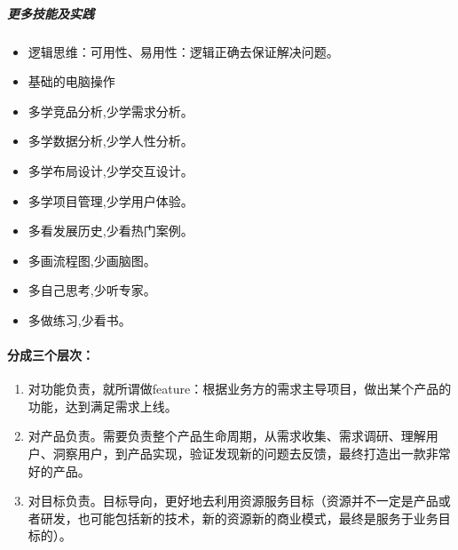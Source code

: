 \documentclass[letterpaper,11pt,english]{sphinxmanual}
\begin{document}
\subparagraph{更多技能及实践}
\label{\detokenize{chapter_introduction/PM:id50}}\begin{itemize}
\item {} 
逻辑思维：可用性、易用性：逻辑正确去保证解决问题。

\item {} 
基础的电脑操作

\item {} 
多学竞品分析,少学需求分析。

\item {} 
多学数据分析,少学人性分析。

\item {} 
多学布局设计,少学交互设计。

\item {} 
多学项目管理,少学用户体验。

\item {} 
多看发展历史,少看热门案例。

\item {} 
多画流程图,少画脑图。

\item {} 
多自己思考,少听专家。

\item {} 
多做练习,少看书。

\end{itemize}


\paragraph{分成三个层次：}
\label{\detokenize{chapter_introduction/PM:id51}}\begin{enumerate}
%
\item {} 
对功能负责，就所谓做feature：根据业务方的需求主导项目，做出某个产品的功能，达到满足需求上线。

\item {} 
对产品负责。需要负责整个产品生命周期，从需求收集、需求调研、理解用户、洞察用户，到产品实现，验证发现新的问题去反馈，最终打造出一款非常好的产品。

\item {} 
对目标负责。目标导向，更好地去利用资源服务目标（资源并不一定是产品或者研发，也可能包括新的技术，新的资源新的商业模式，最终是服务于业务目标的）。

\end{enumerate}
\end{document}
